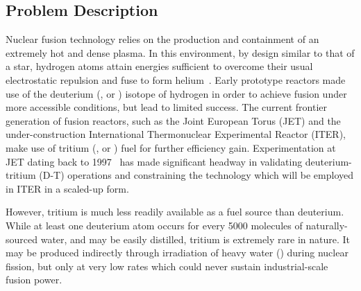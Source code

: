 \subsection{Problem Description}
\label{sec:problemdescription}

Nuclear fusion technology relies on the production and containment of an
extremely hot and dense plasma. In this environment, by design similar to that
of a star, hydrogen atoms attain energies sufficient to overcome their usual
electrostatic repulsion and fuse to form helium~\cite{Hernandez2018}. Early prototype reactors
made use of the deuterium (, or ) isotope of hydrogen in order to
achieve fusion under more accessible conditions, but lead to limited success.
The current frontier generation of fusion reactors, such as the Joint European Torus (JET) and the
under-construction International Thermonuclear Experimental Reactor (ITER), make
use of tritium (, or ) fuel for further efficiency gain.
Experimentation at JET dating back to 1997~\cite{Keilhacker1999} has made significant headway in
validating deuterium-tritium (D-T) operations and constraining the technology
which will be employed in ITER in a scaled-up form.

However, tritium is much less readily available as a fuel source than deuterium.
While at least one deuterium atom occurs for every \num{5000} molecules of
naturally-sourced water, and may be easily distilled, tritium is extremely rare
in nature. It may be produced indirectly through irradiation of heavy water
(\DDO) during nuclear fission, but only at very low rates which could
never sustain industrial-scale fusion power.

